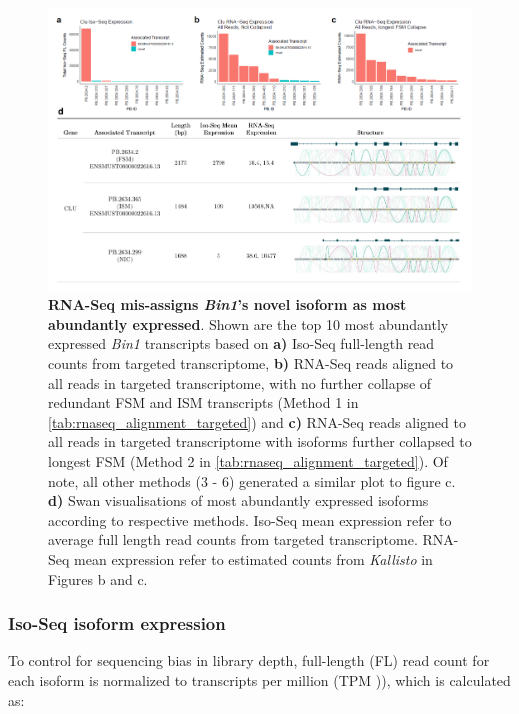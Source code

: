 \begin{landscape}
	
	\begin{figure}[htp]
		\centering
		\includegraphics[page=2,trim={0cm 0cm 0cm 0cm},clip,scale = 0.8]{Figures/ProjectDevelopment_Figures_Landscape.pdf}
		\captionsetup{width=1.2\textwidth,singlelinecheck=off}
		\caption[RNA-Seq mis-assignment of dominant isoform associated with \textit{Bin1}]%
		{\textbf{RNA-Seq mis-assigns \textit{Bin1}'s novel isoform as most abundantly expressed}. Shown are the top 10 most abundantly expressed \textit{Bin1} transcripts based on \textbf{a)} Iso-Seq full-length read counts from targeted transcriptome, \textbf{b)} RNA-Seq reads aligned to all reads in targeted transcriptome, with no further collapse of redundant FSM and ISM transcripts (Method 1 in \cref{tab:rnaseq_alignment_targeted}) and \textbf{c)} RNA-Seq reads aligned to all reads in targeted transcriptome with isoforms further collapsed to longest FSM (Method 2 in \cref{tab:rnaseq_alignment_targeted}). Of note, all other methods (3 - 6) generated a similar plot to figure c. \textbf{d)} Swan visualisations of most abundantly expressed isoforms according to respective methods. Iso-Seq mean expression refer to average full length read counts from targeted transcriptome. RNA-Seq mean expression refer to estimated counts from \textit{Kallisto} in Figures b and c. 
		}
		\label{fig:Bin1_TargetedRNAseqAlignment}
	\end{figure}
\end{landscape}
\restoregeometry

\subsubsection{Iso-Seq isoform expression}
To control for sequencing bias in library depth, full-length (FL) read count for each isoform is normalized to transcripts per million (TPM )), which is calculated as: 

